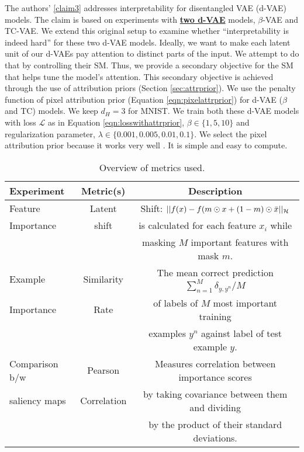 The authors' \ref{claim3} addresses interpretability for disentangled VAE (d-VAE) models. The claim is based on experiments with \underline{\textbf{two d-VAE}} models, $\beta$-VAE and TC-VAE. We extend this original setup to examine whether \enquote{interpretability is indeed hard} for these two d-VAE models. Ideally, we want to make each latent unit of our d-VAEs pay attention to distinct parts of the input. We attempt to do that by controlling their SM. Thus, we provide a secondary objective for the SM that helps tune the model's attention. This secondary objective is achieved through the use of attribution priors (Section \ref{sec:attrprior}).
 We use the penalty function of pixel attribution prior (Equation \ref{eqn:pixelattrprior}) for d-VAE ($\beta$ and TC) models. We keep $d_H=3$ for MNIST. We train both these d-VAE models with loss $\mathcal{L}$  as in Equation \ref{eqn:losswithattrprior},  $\beta\in \{1,5,10\}$ and regularization parameter, $\lambda \in \{0.001, 0.005, 0.01, 0.1\}$. We select the pixel attribution prior because it works very well \citep{attrprior}. It is simple and easy to compute.

\begin{table}[H]
    \small
    \centering
    \begin{tabular}{lcc}
    \toprule
     \textbf{Experiment} & \textbf{Metric(s)} & \textbf{Description} \\
    \midrule 
    Feature & Latent & Shift:
     $||f(x)-f(m \odot x + (1-m)\odot\Bar{x}||_\mathcal{H}$   \\
    Importance & shift & is calculated for each feature $x_i$ while \\
        & & masking $M$ important features with mask $m$. \\
    \midrule   
    Example & Similarity & The mean correct prediction $\sum_{n=1}^M \delta_{y,y^{n}}/M$ \\
    Importance & Rate & of labels of $M$ most important training \\
        & & examples $y^n$ against label of test example $y$. \\
    \midrule
    Comparison b/w & Pearson & Measures correlation between importance scores \\
    saliency maps & Correlation & by taking covariance between them and dividing \\
        & & by the product of their standard deviations.  \\
    \bottomrule
    \end{tabular}
    \caption{Overview of metrics used.}
    \label{tab:metricsoverview}
\end{table}

